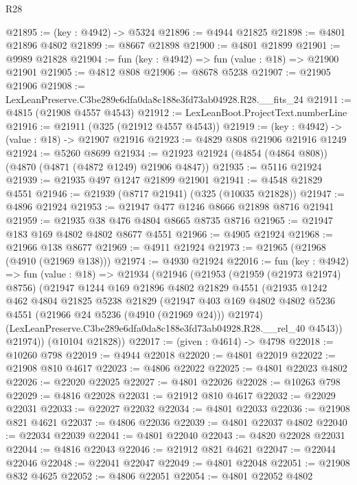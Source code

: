 \begin{lexlean}{R28}
\begin{coremodule}
@21895 := (key : @4942) -> @5324
@21896 := @4944 @21825
@21898 := @4801 @21896 @4802
@21899 := @8667 @21898
@21900 := @4801 @21899
@21901 := @9989 @21828
@21904 := fun (key : @4942) => fun (value : @18) => @21900 @21901
@21905 := @4812 @808
@21906 := @8678 @5238
@21907 := @21905 @21906
@21908 := LexLeanPreserve.C3be289e6dfa0da8c188e3fd73ab04928.R28.__fits_24
@21911 := @4815 (@21908 @4557 @4543)
@21912 := LexLeanBoot.ProjectText.numberLine
@21916 := @21911 (@325 (@21912 @4557 @4543))
@21919 := (key : @4942) -> (value : @18) -> @21907 @21916
@21923 := @4829 @808 @21906 @21916 @1249
@21924 := @5260 @8699
@21934 := @21923 @21924 (@4854 (@4864 @808)) (@4870 (@4871 (@4872 @1249) @21906 @4847))
@21935 := @5116 @21924
@21939 := @21935 @497 @1247 @21899 @21901
@21941 := @4548 @21829 @4551
@21946 := @21939 (@8717 @21941) (@325 (@10035 @21828))
@21947 := @4896 @21924
@21953 := @21947 @477 @1246 @8666 @21898 @8716 @21941
@21959 := @21935 @38 @476 @4804 @8665 @8735 @8716
@21965 := @21947 @183 @169 @4802 @4802 @8677 @4551
@21966 := @4905 @21924
@21968 := @21966 @138 @8677
@21969 := @4911 @21924
@21973 := @21965 (@21968 (@4910 (@21969 @138)))
@21974 := @4930 @21924
@22016 := fun (key : @4942) =>
  fun (value : @18) =>
  @21934
    (@21946
      (@21953
        (@21959 (@21973 @21974) @8756)
        (@21947
          @1244
          @169
          @21896
          @4802
          @21829
          @4551
          (@21935
            @1242
            @462
            @4804
            @21825
            @5238
            @21829
            (@21947
              @403
              @169
              @4802
              @4802
              @5236
              @4551
              (@21966 @24 @5236 (@4910 (@21969 @24)))
              @21974)
            (LexLeanPreserve.C3be289e6dfa0da8c188e3fd73ab04928.R28.__rel_40 @4543))
          @21974))
      (@10104 @21828))
@22017 := (given : @4614) -> @4798
@22018 := @10260 @798
@22019 := @4944 @22018
@22020 := @4801 @22019
@22022 := @21908 @810 @4617
@22023 := @4806 @22022
@22025 := @4801 @22023 @4802
@22026 := @22020 @22025
@22027 := @4801 @22026
@22028 := @10263 @798
@22029 := @4816 @22028
@22031 := @21912 @810 @4617
@22032 := @22029 @22031
@22033 := @22027 @22032
@22034 := @4801 @22033
@22036 := @21908 @821 @4621
@22037 := @4806 @22036
@22039 := @4801 @22037 @4802
@22040 := @22034 @22039
@22041 := @4801 @22040
@22043 := @4820 @22028 @22031
@22044 := @4816 @22043
@22046 := @21912 @821 @4621
@22047 := @22044 @22046
@22048 := @22041 @22047
@22049 := @4801 @22048
@22051 := @21908 @832 @4625
@22052 := @4806 @22051
@22054 := @4801 @22052 @4802

\end{coremodule}
\end{lexlean}

